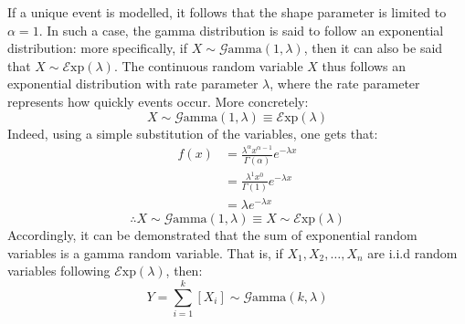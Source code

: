 \documentclass[12pt]{article}
\newcommand{\E}{\mathcal{E}}
\newcommand{\G}{\mathcal{G}}
\begin{document}
If a unique event is modelled, it follows that the shape parameter is limited to $\alpha = 1$. In such a case, the gamma
distribution is said to follow an exponential distribution: more specifically, if $X\sim\G\text{amma}(1, \lambda)$, then
it can also be said that $X\sim\E\text{xp}(\lambda)$. The continuous random variable $X$ thus follows an exponential
distribution with rate parameter $\lambda$, where the rate parameter represents how quickly events occur. More
concretely:
\begin{equation}
	X\sim\G\text{amma}(1, \lambda)\equiv\E\text{xp}(\lambda)
\end{equation}
Indeed, using a simple substitution of the variables, one gets that:
\begin{equation}\label{eq:relation:exp}
	\begin{split}
		f(x)	&=	\frac{\lambda^\alpha x^{\alpha-1}}{\Gamma(\alpha)}e^{-\lambda x}\\
				&=	\frac{\lambda^1 x^{0}}{\Gamma(1)}e^{-\lambda x}\\
				&=	\lambda e^{-\lambda x}
	\end{split}
\end{equation}
\begin{equation}
	\therefore X\sim\G\text{amma}(1, \lambda)\equiv X\sim\E\text{xp}(\lambda)
\end{equation}
Accordingly, it can be demonstrated that the sum of exponential random variables is a gamma random variable. That is, if
$X_1, X_2, \ldots, X_n$ are i.i.d random variables following $\E\text{xp}(\lambda)$, then:
\begin{equation}
	Y=\sum^k_{i=1}\left[X_i\right]\sim\G\text{amma}(k, \lambda)
\end{equation}
\end{document}
